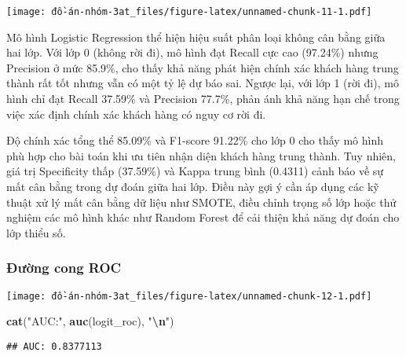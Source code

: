 \documentclass[
]{article}
\newenvironment{Shaded}{\begin{snugshade}}{\end{snugshade}}
\newcommand{\AttributeTok}[1]{\textcolor[rgb]{0.13,0.29,0.53}{#1}}
\newcommand{\ConstantTok}[1]{\textcolor[rgb]{0.56,0.35,0.01}{#1}}
\newcommand{\FunctionTok}[1]{\textcolor[rgb]{0.13,0.29,0.53}{\textbf{#1}}}
\newcommand{\NormalTok}[1]{#1}
\newcommand{\OtherTok}[1]{\textcolor[rgb]{0.56,0.35,0.01}{#1}}
\newcommand{\SpecialCharTok}[1]{\textcolor[rgb]{0.81,0.36,0.00}{\textbf{#1}}}
\newcommand{\StringTok}[1]{\textcolor[rgb]{0.31,0.60,0.02}{#1}}
\begin{document}
\texttt{[image: đồ-án-nhóm-3at\_files/figure-latex/unnamed-chunk-11-1.pdf]}

Mô hình Logistic Regression thể hiện hiệu suất phân loại không cân bằng
giữa hai lớp. Với lớp 0 (không rời đi), mô hình đạt Recall cực cao
(97.24\%) nhưng Precision ở mức 85.9\%, cho thấy khả năng phát hiện
chính xác khách hàng trung thành rất tốt nhưng vẫn có một tỷ lệ dự báo
sai. Ngược lại, với lớp 1 (rời đi), mô hình chỉ đạt Recall 37.59\% và
Precision 77.7\%, phản ánh khả năng hạn chế trong việc xác định chính
xác khách hàng có nguy cơ rời đi.

Độ chính xác tổng thể 85.09\% và F1-score 91.22\% cho lớp 0 cho thấy mô
hình phù hợp cho bài toán khi ưu tiên nhận diện khách hàng trung thành.
Tuy nhiên, giá trị Specificity thấp (37.59\%) và Kappa trung bình
(0.4311) cảnh báo về sự mất cân bằng trong dự đoán giữa hai lớp. Điều
này gợi ý cần áp dụng các kỹ thuật xử lý mất cân bằng dữ liệu như SMOTE,
điều chỉnh trọng số lớp hoặc thử nghiệm các mô hình khác như Random
Forest để cải thiện khả năng dự đoán cho lớp thiểu số.

\subsubsection{Đường cong ROC}\label{sec-logistic-roc}

\begin{Shaded}
\end{Shaded}

\texttt{[image: đồ-án-nhóm-3at\_files/figure-latex/unnamed-chunk-12-1.pdf]}

\begin{Shaded}
\begin{Highlighting}[]
\FunctionTok{cat}\NormalTok{(}\StringTok{"AUC:"}\NormalTok{, }\FunctionTok{auc}\NormalTok{(logit\_roc), }\StringTok{"}\SpecialCharTok{\textbackslash{}n}\StringTok{"}\NormalTok{)}
\end{Highlighting}
\end{Shaded}

\begin{verbatim}
## AUC: 0.8377113
\end{verbatim}
\end{document}
